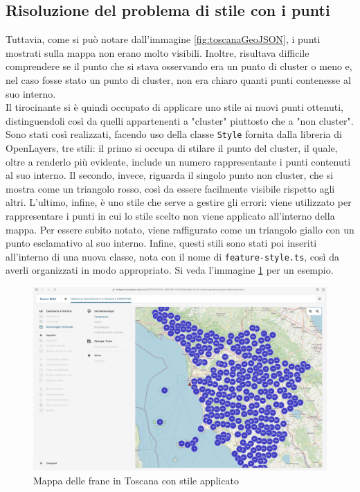 \subsection{Risoluzione del problema di stile con i punti}

Tuttavia, come si può notare dall'immagine \ref{fig:toscanaGeoJSON}, i punti mostrati sulla mappa non erano molto visibili. Inoltre, risultava difficile comprendere se il punto che si stava osservando era un punto di cluster o meno e, nel caso fosse stato un punto di cluster, non era chiaro quanti punti contenesse al suo interno. 
\\Il tirocinante si è quindi occupato di applicare uno stile ai nuovi punti ottenuti, distinguendoli così da quelli appartenenti a "cluster" piuttosto che a "non cluster". Sono stati così realizzati, facendo uso della classe \verb|Style| fornita dalla libreria di OpenLayers, tre stili: il primo si occupa di stilare il punto del cluster, il quale, oltre a renderlo più evidente, include un numero rappresentante i punti contenuti al suo interno. Il secondo, invece, riguarda il singolo punto non cluster, che si mostra come un triangolo rosso, così da essere facilmente visibile rispetto agli altri. L'ultimo, infine, è uno stile che serve a gestire gli errori: viene utilizzato per rappresentare i punti in cui lo stile scelto non viene applicato all'interno della mappa. Per essere subito notato, viene raffigurato come un triangolo giallo con un punto esclamativo al suo interno. Infine, questi stili sono stati poi inseriti all'interno di una nuova classe, nota con il nome di \verb|feature-style.ts|, così da averli organizzati in modo appropriato. Si veda l'immagine \ref{fig:toscanaGeoJSONStyle} per un esempio.
\begin{figure}[htbp]
      \centering
      \includegraphics[width=1\textwidth]{Tesi/images/Capitolo4/toscanaGeoJSONStyle.jpeg}
      \caption{Mappa delle frane in Toscana con stile applicato}
      \label{fig:toscanaGeoJSONStyle}
\end{figure}

